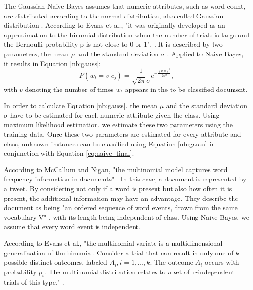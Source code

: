         The Gaussian Naive Bayes assumes that numeric attributes, such as word count, are distributed according to the normal distribution, also called Gaussian distribution \cite{nb_gauss}. According to Evans et al., "it was originally developed as an approximation to the binomial distribution when the number of trials is large and the Bernoulli probability p is not close to 0 or 1". \cite[p.~143]{evans2011statistical}. It is described by two parameters, the mean $\mu$ and the standard deviation $\sigma$ \cite{evans2011statistical}. Applied to Naive Bayes, it results in Equation \eqref{nb:gauss}:
        \begin{equation}
        \label{nb:gauss}
            P(w_t = v|c_j) = \frac{1}{\sqrt{2\pi}\sigma}e^{-\frac{(v.\mu)^2}{2\sigma^2}},
        \end{equation}
        with $v$ denoting the number of times $w_t$ appears in the to be classified document.
        
        In order to calculate Equation \eqref{nb:gauss}, the mean $\mu$ and the standard deviation $\sigma$ have to be estimated for each numeric attribute given the class. Using maximum likelihood estimation, we estimate these two parameters using the training data. Once these two parameters are estimated for every attribute and class, unknown instances can be classified using Equation \eqref{nb:gauss} in conjunction with Equation \eqref{eq:naive_final}.
        
        According to McCallum and Nigan, "the multinomial model captures word frequency information in documents" \cite[p.~3]{Mccallum1998}. In this case, a document is represented by a tweet. By considering not only if a word is present but also how often it is present, the additional information may have an advantage. They describe the document as being "an ordered sequence of word events, drawn from the same vocabulary V" \cite[p.~3]{Mccallum1998}, with its length being independent of class. Using Naive Bayes, we assume that every word event is independent.
        
        
        According to Evans et al., "the multinomial variate is a multidimensional generalization of the binomial. Consider a trial that can result in only one of $k$ possible distinct outcomes, labeled $A_i, i = 1,...,k$. The outcome $A_i$ occurs with probability $p_i$. The multinomial distribution relates to a set of n-independent trials of this type." \cite[p.~135]{evans2011statistical}.
        
